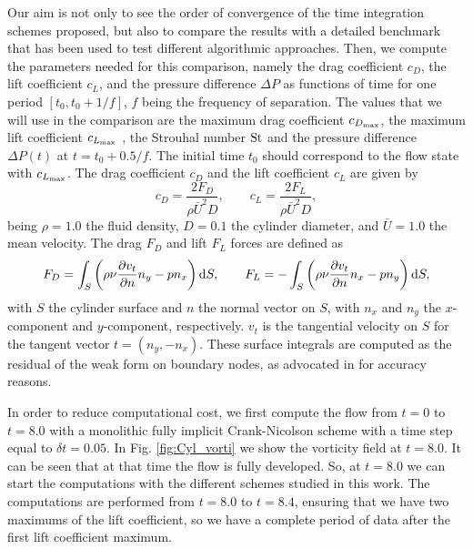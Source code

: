 Our aim is not only to see the order of convergence of the time integration schemes proposed, but also to compare the results with a detailed benchmark that has been used to test different algorithmic approaches. Then, we compute the parameters needed for this comparison, namely the drag coefficient $c_D$, the lift coefficient $c_L$, and the pressure difference $\Delta P$ as functions of time for one period $[t_0,t_0+1/f]$, $f$ being the frequency of separation. The values that we will use in the comparison are the maximum drag coefficient $c_{D_{\rm max}}$, the maximum lift coefficient $c_{L_{\rm max}}$ , the Strouhal number ${\rm St}$ and the pressure difference $\Delta P(t)$ at $t=t_0+0.5/f$. The initial time $t_0$ should correspond to the flow state with $c_{L_{\rm max}}$. The drag coefficient $c_D$ and  the lift coefficient $c_L$ are given by $$c_D=\frac{2F_D}{\rho\bar{U}^2D},\quad\quad c_L=\frac{2F_L}{\rho\bar{U}^2D},$$
being $\rho=1.0$ the fluid density, $D=0.1$ the cylinder diameter, and $\bar{U}=1.0$ the mean velocity. The drag $F_D$ and lift $F_L$ forces are defined as $$F_D=\int_S\left(\rho\nu\frac{\partial v_t}{\partial n}n_y-pn_x\right){\rm d}S,\quad\quad F_L=-\int_S\left(\rho\nu\frac{\partial v_t}{\partial n}n_x-pn_y\right){\rm d}S,$$
with $S$ the cylinder surface and $n$ the normal vector on $S$, with $n_x$ and $n_y$ the $x$-component and $y$-component, respectively. $v_t$ is the tangential velocity on $S$ for the tangent vector $t=(n_y,-n_x)$. These surface integrals are computed as the residual of the weak form on boundary nodes, as advocated in \cite{brezzi_variational_2001} for accuracy reasons.

In order to reduce computational cost, we first compute the flow from $t=0$ to $t=8.0$ with a monolithic fully implicit Crank-Nicolson scheme with a time step equal to $\delta t=0.05$. In Fig. \ref{fig:Cyl_vorti} we show the vorticity field at $t=8.0$. It can be seen that at that time the flow is fully developed. So, at $t=8.0$ we can start the computations with the different schemes studied in this work. The computations are performed from $t=8.0$ to $t=8.4$, ensuring that we have two maximums of the lift coefficient, so we have a complete period of data after the first lift coefficient maximum. 

